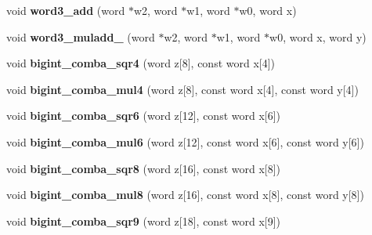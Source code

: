 \begin{DoxyCompactItemize}
\item 
\mbox{\label{namespace_botan_abe47ded26fff4bf68d95106af8879c22}} 
void {\bfseries word3\+\_\+add} (word $\ast$w2, word $\ast$w1, word $\ast$w0, word x)
\item 
\mbox{\label{namespace_botan_ab8cdfd76496ff340c2e1970d1cde1337}} 
void {\bfseries word3\+\_\+muladd\+\_} (word $\ast$w2, word $\ast$w1, word $\ast$w0, word x, word y)
\item 
\mbox{\label{namespace_botan_a6860ccbbfd8836827cd5bf6c3bfae807}} 
void {\bfseries bigint\+\_\+comba\+\_\+sqr4} (word z\mbox{[}8\mbox{]}, const word x\mbox{[}4\mbox{]})
\item 
\mbox{\label{namespace_botan_a1fd2af85783a80acdb744dd0a13c346d}} 
void {\bfseries bigint\+\_\+comba\+\_\+mul4} (word z\mbox{[}8\mbox{]}, const word x\mbox{[}4\mbox{]}, const word y\mbox{[}4\mbox{]})
\item 
\mbox{\label{namespace_botan_a2c556b6e52529aee71f16bdd2d8e10c0}} 
void {\bfseries bigint\+\_\+comba\+\_\+sqr6} (word z\mbox{[}12\mbox{]}, const word x\mbox{[}6\mbox{]})
\item 
\mbox{\label{namespace_botan_ae228fc8d81499547ab6d629b0864f54f}} 
void {\bfseries bigint\+\_\+comba\+\_\+mul6} (word z\mbox{[}12\mbox{]}, const word x\mbox{[}6\mbox{]}, const word y\mbox{[}6\mbox{]})
\item 
\mbox{\label{namespace_botan_aee1eb8900e753075962ec4a8ea38536f}} 
void {\bfseries bigint\+\_\+comba\+\_\+sqr8} (word z\mbox{[}16\mbox{]}, const word x\mbox{[}8\mbox{]})
\item 
\mbox{\label{namespace_botan_a59661689c552486b99c1e7a56e610835}} 
void {\bfseries bigint\+\_\+comba\+\_\+mul8} (word z\mbox{[}16\mbox{]}, const word x\mbox{[}8\mbox{]}, const word y\mbox{[}8\mbox{]})
\item 
\mbox{\label{namespace_botan_a79d10e3bca2dbd969fd2e232ed8dec03}} 
void {\bfseries bigint\+\_\+comba\+\_\+sqr9} (word z\mbox{[}18\mbox{]}, const word x\mbox{[}9\mbox{]})
\item 

\end{DoxyCompactItemize}
